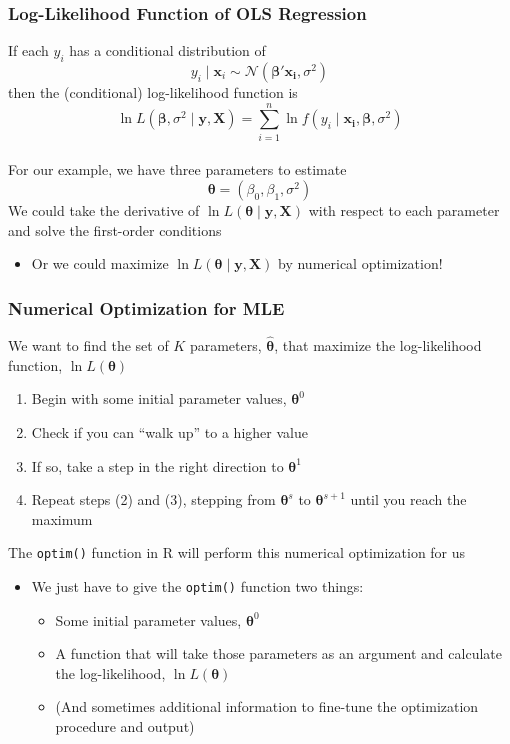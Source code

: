 \documentclass{beamer}\usepackage[]{graphicx}\usepackage[]{xcolor}
\begin{document}
\begin{frame}\frametitle{Log-Likelihood Function of OLS Regression}
    If each $y_i$ has a conditional distribution of
    $$y_i \mid \bm{x}_i \sim \mathcal{N}(\bm{\beta}' \bm{x_i}, \sigma^2)$$
    then the (conditional) log-likelihood function is
    $$\ln L(\bm{\beta}, \sigma^2 \mid \bm{y}, \bm{X}) = \sum_{i = 1}^n \ln f(y_i \mid \bm{x_i}, \bm{\beta}, \sigma^2)$$ \\
    \vspace{2ex}
    For our example, we have three parameters to estimate
    $$\bm{\theta} = \left( \beta_0, \beta_1, \sigma^2 \right)$$
    We could take the derivative of $\ln L(\bm{\theta} \mid \bm{y}, \bm{X})$ with respect to each parameter and solve the first-order conditions
    \begin{itemize}
        \item Or we could maximize $\ln L(\bm{\theta} \mid \bm{y}, \bm{X})$ by numerical optimization!
    \end{itemize}
\end{frame}

\begin{frame}\frametitle{Numerical Optimization for MLE}
    We want to find the set of $K$ parameters, $\widehat{\bm{\theta}}$, that maximize the log-likelihood function, $\ln L(\bm{\theta})$
    \begin{enumerate}
        \item Begin with some initial parameter values, $\bm{\theta}^0$
        \item Check if you can ``walk up'' to a higher value
        \item If so, take a step in the right direction to $\bm{\theta}^1$
        \item Repeat steps (2) and (3), stepping from $\bm{\theta}^s$ to $\bm{\theta}^{s + 1}$ until you reach the maximum
    \end{enumerate}
    \vspace{3ex}
    The \texttt{optim()} function in R will perform this numerical optimization for us
    \begin{itemize}
        \item We just have to give the \texttt{optim()} function two things:
        \begin{itemize}
            \item Some initial parameter values, $\bm{\theta}^0$
            \item A function that will take those parameters as an argument and calculate the log-likelihood, $\ln L(\bm{\theta})$
            \item (And sometimes additional information to fine-tune the optimization procedure and output)
        \end{itemize}
    \end{itemize}
\end{frame}
\end{document}
